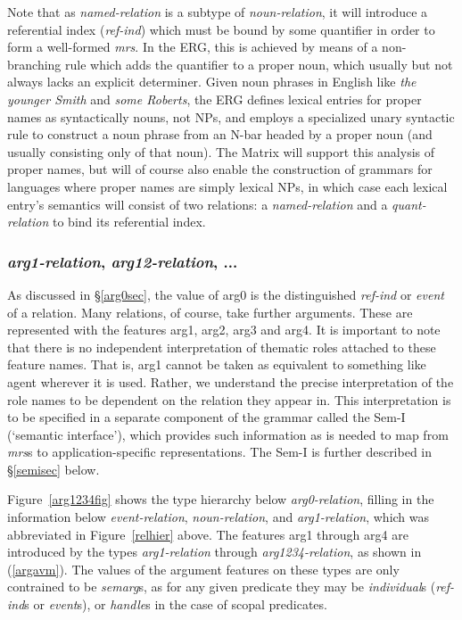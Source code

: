 \documentclass[12pt]{article}
\begin{document}
Note that as {\it named-relation} is a subtype of {\it noun-relation}, it
will introduce a referential index ({\it ref-ind}) which must
be bound by some quantifier in order to form a well-formed {\it mrs}.
In the ERG, this is achieved by means of a non-branching rule
which adds the quantifier to a proper noun, which usually but not always
lacks an explicit determiner.  Given noun phrases in English like {\it the
younger Smith} and {\it some Roberts}, the ERG defines lexical entries
for proper names as syntactically nouns, not NPs, and employs a specialized
unary syntactic rule to construct a noun phrase from an N-bar headed by
a proper noun (and usually consisting only of that noun).  The Matrix will
support this analysis of proper names, but will of course also enable the
construction of grammars for languages where proper names are simply lexical
NPs, in which case each lexical entry's semantics will consist of two
relations: a {\it named-relation} and a {\it quant-relation} to bind its
referential
index.

\subsubsection{{\it arg1-relation}, {\it arg12-relation}, ...}

As discussed in \S\ref{arg0sec}, the value of {\sc arg0} is the
distinguished {\it ref-ind} or {\it event} of a relation.  Many
relations, of course, take further arguments.  These are represented
with the features {\sc arg1}, {\sc arg2}, {\sc arg3} and {\sc arg4}.
It is important to note that there is no independent interpretation
of thematic roles attached to these feature names.  That is, {\sc arg1}
cannot be taken as equivalent to something like {\sc agent} wherever
it is used.
Rather, we understand the precise interpretation of the role names to
be dependent on the relation they appear in.  This interpretation is
to be specified in a separate component of the grammar called the
Sem-I (`semantic interface'), which provides such information as is
needed to map from {\it mrs}s to application-specific representations.
The Sem-I is further described in \S\ref{semisec} below.

Figure~\ref{arg1234fig} shows the type hierarchy below {\it arg0-relation},
filling in the information below {\it event-relation}, {\it noun-relation},
and {\it arg1-relation},
which was abbreviated in Figure~\ref{relhier} above.  The features
{\sc arg1} through {\sc arg4} are introduced by the types {\it
arg1-relation} through {\it arg1234-relation}, as shown in (\ref{argavm}).
The values of the argument features on these types are only
contrained to be {\it semarg}s, as for any given predicate
they may be {\it individual}s ({\it ref-ind}s or {\it event}s), or
{\it handle}s in the case of scopal predicates.
\end{document}

